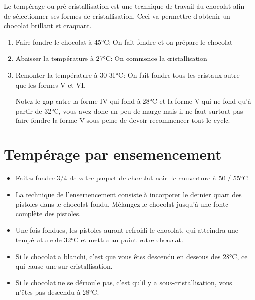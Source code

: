 \documentclass[a4paper,twoside,openright]{report}
\begin{document}
Le tempérage ou pré-cristallisation est une technique de travail du chocolat afin de sélectionner ses formes de cristallisation. Ceci va permettre d'obtenir un chocolat brillant et craquant.

\begin{enumerate}
 \item Faire fondre le chocolat à 45°C: On fait fondre et on prépare le chocolat
 \item Abaisser la température à 27°C: On commence la cristallisation
 \item Remonter la température à 30-31°C: On fait fondre tous les cristaux autre que les formes V et VI. 
 \begin{attention}
Notez le gap entre la forme IV qui fond à 28°C et la forme V qui ne fond qu'à partir de 32°C, vous avez donc un peu de marge mais il ne faut surtout pas faire fondre la forme V sous peine de devoir recommencer tout le cycle.
 \end{attention}

\end{enumerate}

\section{Tempérage par ensemencement}

\begin{itemize}
\item Faites fondre 3/4 de votre paquet de chocolat noir de couverture à 50 / 55°C.
\item La technique de l'ensemencement consiste à incorporer le dernier quart des pistoles dans le chocolat fondu. Mélangez le chocolat jusqu'à une fonte complète des pistoles.
\item Une fois fondues, les pistoles auront refroidi le chocolat, qui atteindra une température de 32°C et mettra au point votre chocolat.
\end{itemize}

\begin{remarque}
\begin{itemize}
\item Si le chocolat a blanchi, c’est que vous êtes descendu en dessous des 28°C, ce qui cause une sur-cristallisation.
\item Si le chocolat ne se démoule pas, c'est qu'il y a sous-cristallisation, vous n'êtes pas descendu à 28°C.
\end{itemize}
\end{remarque}
\end{document}
